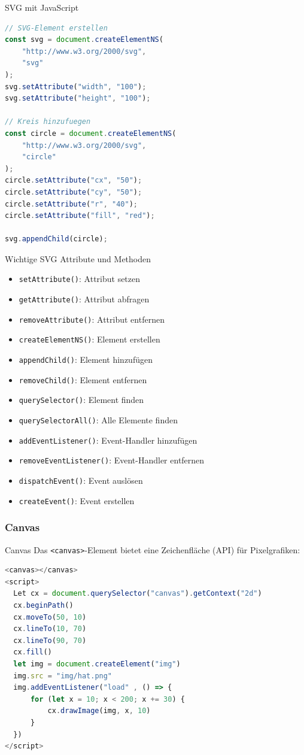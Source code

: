 \begin{examplecode}{SVG mit JavaScript}
\begin{lstlisting}[language=JavaScript, style=basesmol]
// SVG-Element erstellen
const svg = document.createElementNS(
    "http://www.w3.org/2000/svg", 
    "svg"
);
svg.setAttribute("width", "100");
svg.setAttribute("height", "100");

// Kreis hinzufuegen
const circle = document.createElementNS(
    "http://www.w3.org/2000/svg", 
    "circle"
);
circle.setAttribute("cx", "50");
circle.setAttribute("cy", "50");
circle.setAttribute("r", "40");
circle.setAttribute("fill", "red");

svg.appendChild(circle);
\end{lstlisting}
\end{examplecode}

\begin{code}{Wichtige SVG Attribute und Methoden}
\begin{itemize}
  \item \texttt{setAttribute()}: Attribut setzen
  \item \texttt{getAttribute()}: Attribut abfragen
  \item \texttt{removeAttribute()}: Attribut entfernen
  \item \texttt{createElementNS()}: Element erstellen
  \item \texttt{appendChild()}: Element hinzufügen
  \item \texttt{removeChild()}: Element entfernen
  \item \texttt{querySelector()}: Element finden
  \item \texttt{querySelectorAll()}: Alle Elemente finden
  \item \texttt{addEventListener()}: Event-Handler hinzufügen
  \item \texttt{removeEventListener()}: Event-Handler entfernen
  \item \texttt{dispatchEvent()}: Event auslösen
  \item \texttt{createEvent()}: Event erstellen
\end{itemize}
\end{code}

\subsubsection{Canvas}

\begin{definition}{Canvas}
  Das \texttt{<canvas>}-Element bietet eine Zeichenfläche (API) für Pixelgrafiken:
\begin{lstlisting}[language=JavaScript, style=basesmol]
<canvas></canvas>
<script>
  Let cx = document.querySelector("canvas").getContext("2d")
  cx.beginPath()
  cx.moveTo(50, 10)
  cx.lineTo(10, 70)
  cx.lineTo(90, 70)
  cx.fill()
  let img = document.createElement("img")
  img.src = "img/hat.png"
  img.addEventListener("load" , () => {
      for (let x = 10; x < 200; x += 30) {
          cx.drawImage(img, x, 10)
      }
  })
</script>
\end{lstlisting}
\end{definition}


